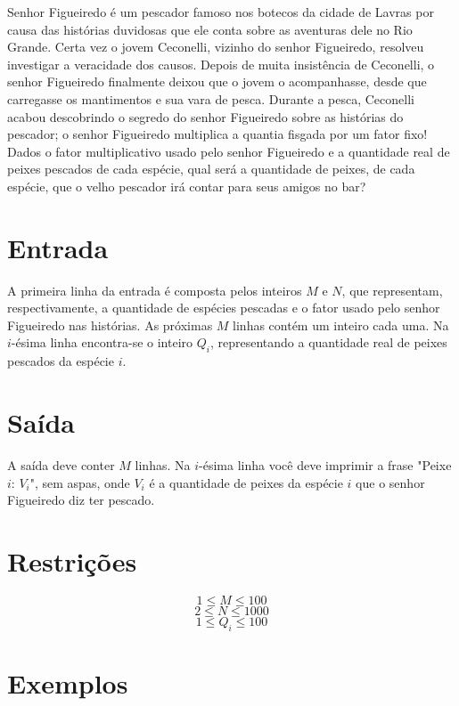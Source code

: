 Senhor Figueiredo é um pescador famoso nos botecos da cidade de Lavras por causa das histórias duvidosas que ele conta sobre as aventuras dele no Rio Grande.
Certa vez o jovem Ceconelli, vizinho do senhor Figueiredo, resolveu investigar a veracidade dos causos.
Depois de muita insistência de Ceconelli, o senhor Figueiredo finalmente deixou que o jovem o acompanhasse, desde que carregasse os mantimentos e sua vara de pesca.
Durante a pesca, Ceconelli acabou descobrindo o segredo do senhor Figueiredo sobre as histórias do pescador; o senhor Figueiredo multiplica a quantia fisgada por um fator fixo!
Dados o fator multiplicativo usado pelo senhor Figueiredo e a quantidade real de peixes pescados de cada espécie, qual será a quantidade de peixes, de cada espécie, que o velho pescador irá contar para seus amigos no bar?

\section*{Entrada}

A primeira linha da entrada é composta pelos inteiros $M$ e $N$, que representam, respectivamente, a quantidade de espécies pescadas e o fator usado pelo senhor Figueiredo nas histórias.
As próximas $M$ linhas contém um inteiro cada uma.
Na $i$-ésima linha encontra-se o inteiro $Q_i$, representando a quantidade real de peixes pescados da espécie $i$.

\section*{Saída}

A saída deve conter $M$ linhas.
Na $i$-ésima linha você deve imprimir a frase "Peixe $i$: $V_i$", sem aspas, onde $V_i$ é a quantidade de peixes da espécie $i$ que o senhor Figueiredo diz ter pescado.

\section*{Restrições}

$$1 \leq M \leq 100$$
$$2 \leq N \leq 1000$$
$$1 \leq Q_i \leq 100$$


\section*{Exemplos}

\exemplo
